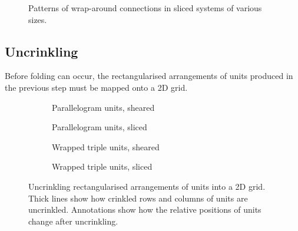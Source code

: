 			\begin{figure}
				\center
				\caption{Patterns of wrap-around connections in sliced systems of
				various sizes.}
				\label{fig:slicing-examples}
			\end{figure}
			
		\subsection{Uncrinkling}
			
			Before folding can occur, the rectangularised arrangements of units
			produced in the previous step must be mapped onto a 2D grid.
			
			\begin{figure}
				\center
				\begin{subfigure}[b]{0.48\linewidth}
					\center
					
					\caption{Parallelogram units, sheared}
					\label{fig:uncrinkling-node-sheared}
				\end{subfigure}
				\begin{subfigure}[b]{0.48\linewidth}
					\center
					
					\caption{Parallelogram units, sliced}
					\label{fig:uncrinkling-node-sliced}
				\end{subfigure}
				
				\vspace{1cm}
				
				\begin{subfigure}[b]{0.48\linewidth}
					\center
					
					\caption{Wrapped triple units, sheared}
					\label{fig:uncrinkling-sheared}
				\end{subfigure}
				\begin{subfigure}[b]{0.48\linewidth}
					\center
					
					\caption{Wrapped triple units, sliced}
					\label{fig:uncrinkling-sliced}
				\end{subfigure}
				
				\vspace{1em}
				
				\caption{Uncrinkling rectangularised arrangements of units into a 2D
				grid. Thick lines show how crinkled rows and columns of units are
				uncrinkled.  Annotations show how the relative positions of units
				change after uncrinkling.}
				\label{fig:uncrinkling}
			\end{figure}
			
